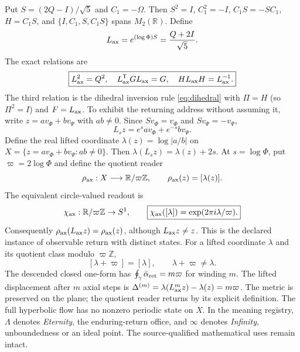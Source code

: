 \documentclass[10pt]{article}
\newcommand{\R}{\mathbb R}
\newcommand{\Z}{\mathbb Z}
\begin{document}
Put $S=(2Q-I)/\sqrt5$ and $C_1=-\Omega$. Then $S^2=I$, $C_1^2=-I$, $C_1S=-SC_1$, $H=C_1S$, and $\{I,C_1,S,C_1S\}$ spans $M_2(\R)$. Define
\begin{equation}L_{\rm ax}=e^{(\log\Phi)S}=\frac{Q+2I}{\sqrt5}.\end{equation}
The exact relations are
\begin{equation}\boxed{L_{\rm ax}^2=Q^2,\quad L_{\rm ax}^{\mathsf T}GL_{\rm ax}=G,\quad HL_{\rm ax}H=L_{\rm ax}^{-1}.}\end{equation}
The third relation is the dihedral inversion rule \eqref{eq:dihedral} with $\Pi=H$ (so $\Pi^2=I$) and $F=L_{\rm ax}$. To exhibit the returning address without assuming it, write
$z=a v_\Phi+b v_\Psi$ with $ab\ne0$. Since
$S v_\Phi=v_\Phi$ and $S v_\Psi=-v_\Psi$,
\[
L_s z=e^s a v_\Phi+e^{-s}b v_\Psi.
\]
Define the real lifted coordinate $\lambda(z)=\log|a/b|$ on
$X=\{z=av_\Phi+bv_\Psi:ab\ne0\}$. Then
$\lambda(L_s z)=\lambda(z)+2s$. At $s=\log\Phi$, put
$\varpi=2\log\Phi$ and define the quotient reader
\[
\rho_{\rm ax}:X\longrightarrow\R/\varpi\Z,\qquad
\rho_{\rm ax}(z)=[\lambda(z)].
\]
The equivalent circle-valued readout is
\begin{equation}
\chi_{\rm ax}:\R/\varpi\Z\to S^1,\qquad
\boxed{\chi_{\rm ax}([\lambda])=\exp(2\pi i\lambda/\varpi).}
\end{equation}
Consequently $\rho_{\rm ax}(L_{\rm ax}z)=\rho_{\rm ax}(z)$,
although $L_{\rm ax}z\ne z$. This is the declared instance of
observable return with distinct states. For a lifted coordinate
$\lambda$ and its quotient class modulo $\varpi\Z$,
\begin{equation}\boxed{[\lambda+\varpi]=[\lambda],\qquad\lambda+\varpi\ne\lambda.}\end{equation}
The descended closed one-form has $\oint_\gamma\bar\alpha_{\rm ret}=m\varpi$ for winding $m$. The lifted displacement after $m$ axial steps is
$\Delta^{(m)}=\lambda(L_{\rm ax}^m z)-\lambda(z)=m\varpi$.
The metric is preserved on the plane; the quotient reader returns
by its explicit definition. The full hyperbolic flow has no nonzero
periodic state on $X$. In the meaning registry, $\Lambda$ denotes \emph{Eternity}, the enduring-return office, and $\infty$ denotes \emph{Infinity}, unboundedness or an ideal point. The source-qualified mathematical uses remain intact.
\end{document}
